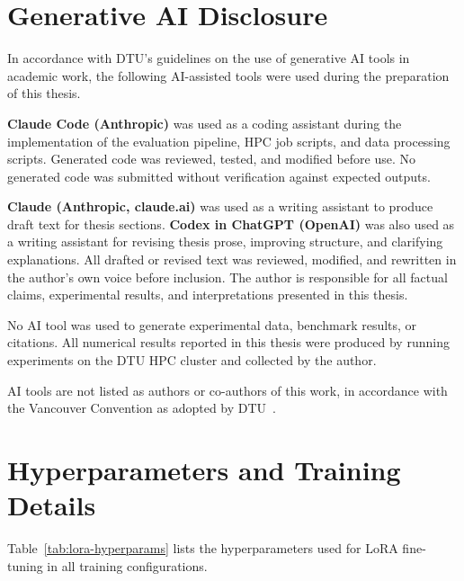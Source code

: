 \chapter{Generative AI Disclosure}
\label{app:ai-disclosure}

In accordance with DTU's guidelines on the use of generative AI tools in
academic work, the following AI-assisted tools were used during the
preparation of this thesis.

\textbf{Claude Code (Anthropic)} was used as a coding assistant during
the implementation of the evaluation pipeline, HPC job scripts, and data
processing scripts. Generated code was reviewed, tested, and modified
before use. No generated code was submitted without verification against
expected outputs.

\textbf{Claude (Anthropic, claude.ai)} was used as a writing assistant
to produce draft text for thesis sections. \textbf{Codex in ChatGPT
(OpenAI)} was also used as a writing assistant for revising thesis prose,
improving structure, and clarifying explanations. All drafted or revised
text was reviewed, modified, and rewritten in the author's own voice before
inclusion. The author is responsible for all factual claims, experimental
results, and interpretations presented in this thesis.

No AI tool was used to generate experimental data, benchmark results,
or citations. All numerical results reported in this thesis were produced
by running experiments on the DTU HPC cluster and collected by the author.

AI tools are not listed as authors or co-authors of this work, in
accordance with the Vancouver Convention as adopted by
DTU~\cite{ICMJE2020vancouver}.

\chapter{Hyperparameters and Training Details}
\label{app:hyperparameters}

Table~\ref{tab:lora-hyperparams} lists the hyperparameters used for
LoRA fine-tuning in all training configurations.

